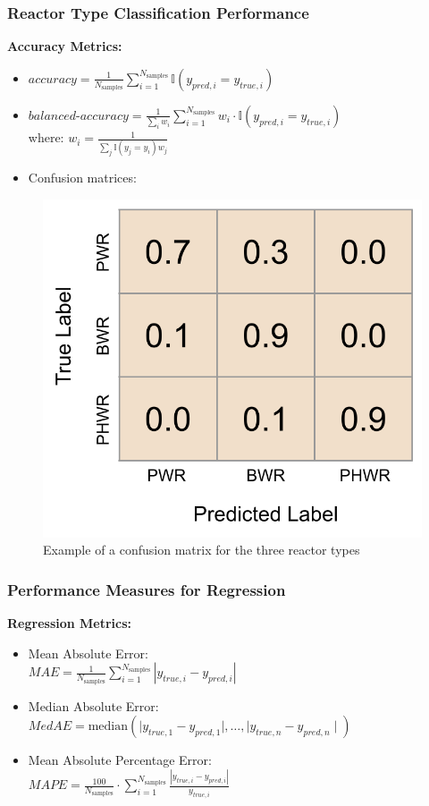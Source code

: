 \begin{frame}
  \frametitle{Reactor Type Classification Performance}
  \textbf{Accuracy Metrics:} \cite{scikit}
  \vspace{2mm}
  \begin{itemize}\addtolength{\itemsep}{0.4\baselineskip}
    \item $\textit{accuracy} = \frac{1}{N_\text{samples}} \sum_{i=1}^{N_\text{samples}} 
                               \mathbb{I}(y_{pred,i} = y_{true,i})$
    \item $\textit{balanced-accuracy} = \frac{1}{\sum_{i}{w_i}} \sum_{i=1}^{N_\text{samples}}
                                        w_i \cdot \mathbb{I}(y_{pred, i} = y_{true, i})$ \\
          \hspace{1.1cm} where: $w_i = \frac{1}{\sum_j{\mathbb{I}(y_j = y_i) w_j}}$
    \item Confusion matrices: 
  \end{itemize}
  \begin{figure}
    \centering
    \includegraphics[width=0.34\linewidth]{./figures/cm_example.png}
    \caption{Example of a confusion matrix for the three reactor types}
  \end{figure}
\end{frame}

\begin{frame}
  \frametitle{Performance Measures for Regression}
  \textbf{Regression Metrics:} \cite{scikit}
  \vspace{2mm}
  \begin{itemize}\addtolength{\itemsep}{0.4\baselineskip}
    \item Mean Absolute Error:\\ \vspace{2mm}
          $\textit{MAE} = \frac{1}{N_{\text{samples}}} \sum_{i=1}^{N_{\text{samples}}} \left| y_{true, i} - y_{pred, i} \right|$
    \item Median Absolute Error:\\ \vspace{2mm}
          $\textit{MedAE} = \text{median}(\mid y_{true, 1} - y_{pred, 1} \mid, \ldots, 
                                          \mid y_{true, n} - y_{pred, n} \mid)$
    \item Mean Absolute Percentage Error:\\ \vspace{2mm}
          $\textit{MAPE} =  \frac{100}{N_{\text{samples}}} \cdot 
                            \sum_{i=1}^{N_{\text{samples}}}
                            \frac{\left| y_{true, i} - y_{pred, i} \right|}{y_{true, i}}$
  \end{itemize}
\end{frame}


